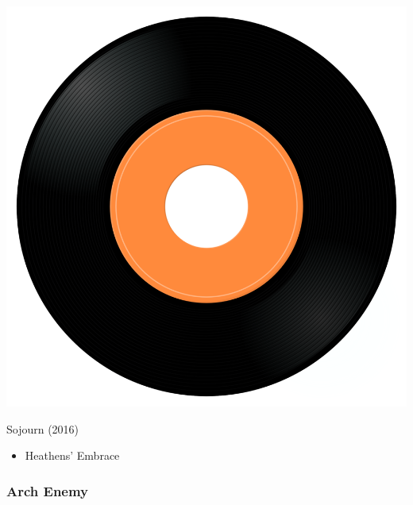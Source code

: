 \begin{minipage}[t]{0.25\textwidth}\vspace{0pt}
\captionsetup{type=figure}
\includegraphics[width=\textwidth]{Images/cover.png}
\caption*{Sojourn (2016)}
\end{minipage}
\begin{minipage}[t]{0.25\textwidth}\vspace{0pt}
\begin{itemize}[nosep,leftmargin=1em,labelwidth=*,align=left]
	\setlength{\itemsep}{0pt}
	\item Heathens' Embrace
\end{itemize}
\end{minipage}

\subsubsection{Arch Enemy}

